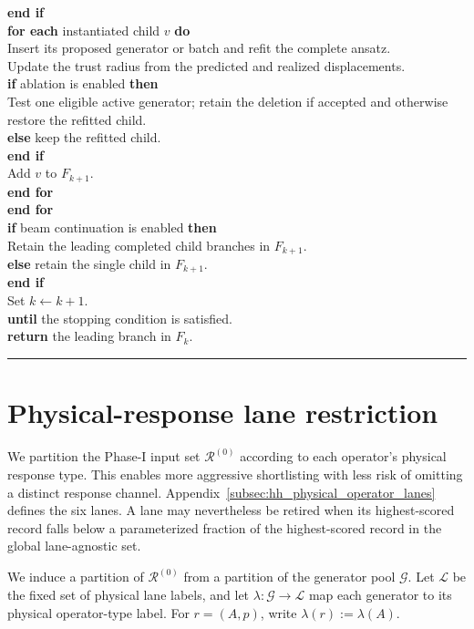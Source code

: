 \documentclass[
  reprint,
  amsmath,
  amssymb,
  aps,
  pra,
  nofootinbib,
  superscriptaddress,
  floatfix
]{revtex4-2}
\begin{document}
\begin{widetext}
\begin{tabbing}
\>\>\textbf{end if}\\
\>\>\textbf{for each} instantiated child \(v\) \textbf{do}\\
\>\>\>Insert its proposed generator or batch and refit the complete ansatz.\\
\>\>\>Update the trust radius from the predicted and realized displacements.\\
\>\>\>\textbf{if} ablation is enabled \textbf{then}\\
\>\>\>\>Test one eligible active generator; retain the deletion if accepted and otherwise restore the refitted child.\\
\>\>\>\textbf{else} keep the refitted child.\\
\>\>\>\textbf{end if}\\
\>\>\>Add \(v\) to \(F_{k+1}\).\\
\>\>\textbf{end for}\\
\>\textbf{end for}\\
\>\textbf{if} beam continuation is enabled \textbf{then}\\
\>\>Retain the leading completed child branches in \(F_{k+1}\).\\
\>\textbf{else} retain the single child in \(F_{k+1}\).\\
\>\textbf{end if}\\
\>Set \(k\leftarrow k+1\).\\
\textbf{until} the stopping condition is satisfied.\\
\textbf{return} the leading branch in \(F_k\).
\end{tabbing}
\noindent\rule{\textwidth}{0.4pt}
\end{widetext}

\section{Physical-response lane restriction}

We partition the Phase-I input set \(\mathcal R^{(0)}\) according to each operator's physical response
type. This enables more aggressive shortlisting with less risk of omitting a
distinct response channel. Appendix~\ref{subsec:hh_physical_operator_lanes}
defines the six lanes. A lane may nevertheless be retired when its
highest-scored record falls below a parameterized fraction of the
highest-scored record in the global lane-agnostic set.

We induce a partition of \(\mathcal R^{(0)}\) from a partition of the generator pool
\(\mathcal G\). Let \(\mathcal L\) be the fixed set of
physical lane labels, and let \(\lambda:\mathcal G\to\mathcal L\) map each
generator to its physical operator-type label. For \(r=(A,p)\), write
\(\lambda(r):=\lambda(A)\).
\end{document}
